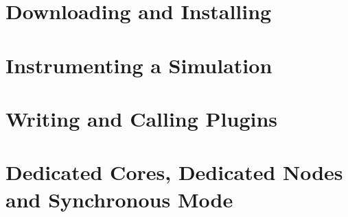 \documentclass[11pt]{report}
\begin{document}
\chapter{Downloading and Installing}\label{chap:downloadingAndInstalling}





\chapter{Instrumenting a Simulation}\label{Instrumenting}



\chapter{Writing and Calling Plugins}\label{Plugins}





\chapter{Dedicated Cores, Dedicated Nodes and Synchronous Mode}\label{modes}



\end{document}
